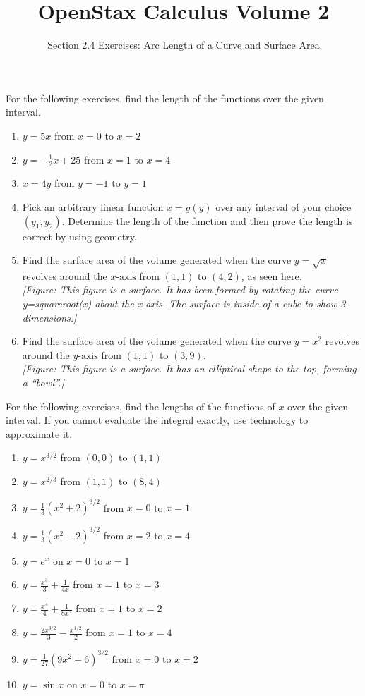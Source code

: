 \documentclass{exercises}
\title{OpenStax Calculus Volume 2}
\subtitle{Section 2.4 Exercises: Arc Length of a Curve and Surface Area}
\author{}
\date{}
\begin{document}
\maketitle


For the following exercises, find the length of the functions over the given interval.

\begin{enumerate}[start=1]
\item $y=5x$ from $x=0$ to $x=2$
\item $y=-\frac{1}{2}x+25$ from $x=1$ to $x=4$
\item $x=4y$ from $y=-1$ to $y=1$
\item Pick an arbitrary linear function $x=g(y)$ over any interval of your choice $(y_{1},y_{2})$. Determine the length of the function and then prove the length is correct by using geometry.
\item Find the surface area of the volume generated when the curve $y=\sqrt{x}$ revolves around the $x\text{-axis}$ from $(1,1)$ to $(4,2)$, as seen here. \\ \textit{[Figure: This figure is a surface. It has been formed by rotating the curve y=squareroot(x) about the x-axis. The surface is inside of a cube to show 3-dimensions.]}
\item Find the surface area of the volume generated when the curve $y=x^{2}$ revolves around the $y\text{-axis}$ from $(1,1)$ to $(3,9)$. \\ \textit{[Figure: This figure is a surface. It has an elliptical shape to the top, forming a ``bowl''.]}
\end{enumerate}

For the following exercises, find the lengths of the functions of $x$ over the given interval. If you cannot evaluate the integral exactly, use technology to approximate it.

\begin{enumerate}[resume]
\item $y=x^{3/2}$ from $(0,0)$ to $(1,1)$
\item $y=x^{2/3}$ from $(1,1)$ to $(8,4)$
\item $y=\frac{1}{3}(x^{2}+2)^{3/2}$ from $x=0$ to $x=1$
\item $y=\frac{1}{3}(x^{2}-2)^{3/2}$ from $x=2$ to $x=4$
\item \techrequired $y=e^{x}$ on $x=0$ to $x=1$
\item $y=\frac{x^{3}}{3}+\frac{1}{4x}$ from $x=1$ to $x=3$
\item $y=\frac{x^{4}}{4}+\frac{1}{8x^{2}}$ from $x=1$ to $x=2$
\item $y=\frac{2x^{3/2}}{3}-\frac{x^{1/2}}{2}$ from $x=1$ to $x=4$
\item $y=\frac{1}{27}(9x^{2}+6)^{3/2}$ from $x=0$ to $x=2$
\item \techrequired $y=\sin x$ on $x=0$ to $x=\pi$
\end{enumerate}
\end{document}
